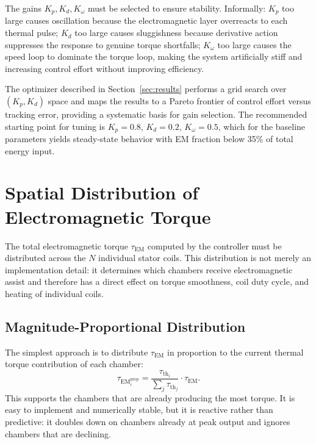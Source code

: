 \documentclass[11pt, a4paper]{article}
\theoremstyle{plain}
\theoremstyle{definition}
\newcommand{\tauEM}{\tau_{\mathrm{EM}}}
\newcommand{\tauth}{\tau_{\mathrm{th}}}
\newcommand{\om}{\omega}
\newcommand{\Nch}{N}
\begin{document}
The gains $K_p, K_d, K_\om$ must be selected to ensure stability. Informally: $K_p$ too large causes oscillation because the electromagnetic layer overreacts to each thermal pulse; $K_d$ too large causes sluggishness because derivative action suppresses the response to genuine torque shortfalls; $K_\om$ too large causes the speed loop to dominate the torque loop, making the system artificially stiff and increasing control effort without improving efficiency.

The optimizer described in Section~\ref{sec:results} performs a grid search over $(K_p, K_d)$ space and maps the results to a Pareto frontier of control effort versus tracking error, providing a systematic basis for gain selection. The recommended starting point for tuning is $K_p = 0.8$, $K_d = 0.2$, $K_\om = 0.5$, which for the baseline parameters yields steady-state behavior with EM fraction below 35\% of total energy input.

\section{Spatial Distribution of Electromagnetic Torque}
\label{sec:distribution}

The total electromagnetic torque $\tauEM$ computed by the controller must be distributed across the $\Nch$ individual stator coils. This distribution is not merely an implementation detail: it determines which chambers receive electromagnetic assist and therefore has a direct effect on torque smoothness, coil duty cycle, and heating of individual coils.

\subsection{Magnitude-Proportional Distribution}

The simplest approach is to distribute $\tauEM$ in proportion to the current thermal torque contribution of each chamber:
\begin{equation}
  \tauEM_i^{\mathrm{prop}} = \frac{\tauth_i}{\sum_j \tauth_j} \cdot \tauEM.
\end{equation}
This supports the chambers that are already producing the most torque. It is easy to implement and numerically stable, but it is reactive rather than predictive: it doubles down on chambers already at peak output and ignores chambers that are declining.
\end{document}
